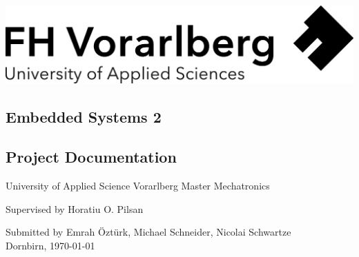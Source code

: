 \documentclass[a4paper,12pt,twoside]{scrreprt}
\begin{document}
\cleardoublepage   %
\thispagestyle{empty}
\begin{titlepage}
  \begin{flushright}
  \includegraphics[width=0.4\linewidth]{Logo-A3}
  \end{flushright}
  \begin{flushleft}
  \section*{Embedded Systems 2}
  \subsection*{Project Documentation}
  \vspace{1cm}
  \vspace{1cm}

  \vspace{1cm}
  University of Applied Science Vorarlberg\newline
  Master Mechatronics

  \vspace{2cm}
  
  Supervised by \newline
  Horatiu O. Pilsan
  
  \vspace{2cm}
  
  Submitted by\newline
  Emrah Öztürk, \newline
  Michael Schneider, \newline
  Nicolai Schwartze\newline
  \\
  Dornbirn, \today
  \end{flushleft}
\end{titlepage}



\thispagestyle{empty}
\cleardoublepage   %
\tableofcontents

\thispagestyle{empty}
\fancyfoot[C]{\thepage}%
\clearpage
{}
{}
\listoffigures

\thispagestyle{empty}
\fancyfoot[C]{\thepage}%
\clearpage
{}
{}
\listoftables
\end{document}
